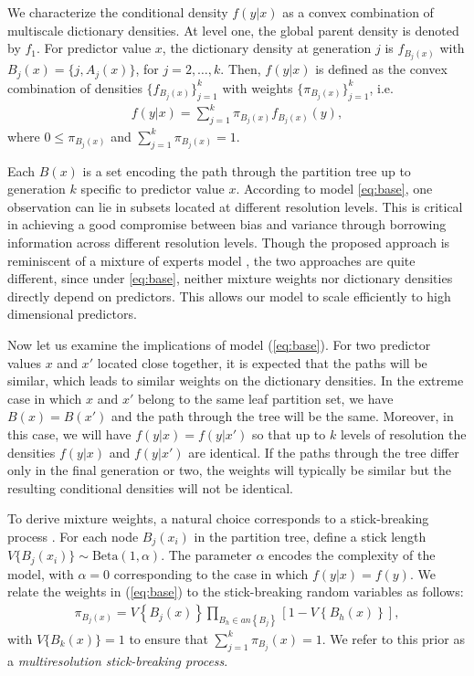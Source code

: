 \documentclass{article}
\begin{document}
We characterize the conditional density $f(y|x)$ as a convex combination of multiscale dictionary densities.  At level one, the global parent density is denoted by $f_1$. For predictor value $x$, the dictionary density at generation $j$ is $f_{B_j(x)}$ with $B_j(x)=\{j,A_j(x)\}$, for $j=2,\ldots, k$. Then, $f(y|x)$ is defined as the convex combination of densities $\{f_{B_j(x)}\}_{j=1}^k$ with weights $\{\pi_{B_j(x)} \}_{j=1}^k$, i.e.
\begin{eqnarray}
f(y|x) = \sum_{j=1}^k \pi_{B_j(x)} f_{B_j(x)}(y),  \label{eq:base}
\end{eqnarray}
where $0 \le \pi_{B_j(x)}$ and $\sum_{j=1}^k \pi_{B_j(x)}=1$. 

Each $B(x)$ is a set encoding the path through the partition tree up to generation $k$ specific to predictor value $x$. According to model \eqref{eq:base}, one observation can lie in subsets located at different resolution levels. This is critical in achieving a good compromise between bias and variance through borrowing information across different resolution levels. Though the proposed approach is reminiscent of a mixture of experts model \cite{mixtureexperts}, the two approaches are quite different, since under \eqref{eq:base}, neither mixture weights nor dictionary densities directly depend on predictors. This allows our model to scale efficiently to high dimensional predictors.

Now let us examine the implications of model (\ref{eq:base}). For two predictor values $x$ and $x'$ located close together, it is expected that the paths will be similar, which leads to similar weights on the dictionary densities.  In the extreme case in which $x$ and $x'$ belong to the same leaf partition set, we have $B(x) = B(x')$ and the path through the tree will be the same.  Moreover, in this case, we will have $f(y|x)=f(y|x')$ so that up to $k$ levels of resolution the densities $f(y|x)$ and $f(y|x')$ are identical.  If the paths through the tree differ only in the final generation or two, the weights will typically be similar but the resulting conditional densities will not be identical. 

To derive mixture weights, a natural choice corresponds to a stick-breaking process \cite{stickbreaking}.  For each node $B_j(x_i)$ in the partition tree, define a stick length $V\{B_j(x_i)\} \sim \mbox{Beta}(1,\alpha)$.  The parameter $\alpha$ encodes the complexity of the model, with $\alpha=0$ corresponding to the case in which $f(y|x) = f(y)$.  We relate the weights in (\ref{eq:base}) to the stick-breaking random variables as follows: 
\begin{eqnarray*}
\pi_{B_j(x)} = V\left\{B_j(x)\right\} \prod_{B_h \in an\left\{B_j\right\}} \left[1 - V\left\{B_h(x)\right\}\right],
\end{eqnarray*}
with $V\{B_k(x)\}=1$ to ensure that $\sum_{j=1}^k \pi_{B_j}(x) = 1$.   We refer to this prior as a {\em multiresolution stick-breaking process}.   
\vskip 12pt
\end{document}
